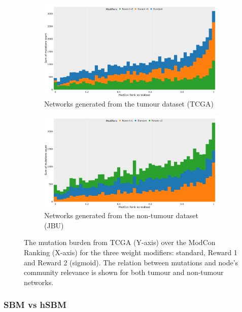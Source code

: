 \begin{figure}[!htb]
    \centering
    \begin{subfigure}{1.0\linewidth}
        \includegraphics[width=1.0\textwidth,keepaspectratio]{Sections/Network_II/validation/tum_modCon_hist.png}
        \caption{Networks generated from the tumour dataset (TCGA)}
    \end{subfigure} %
    \centering
    \begin{subfigure}{1.0\linewidth}
        \includegraphics[width=1.0\textwidth,keepaspectratio]{Sections/Network_II/validation/non_tum_modCon_hist.png}
        \caption{Networks generated from the non-tumour dataset (JBU)}
    \end{subfigure}
    \centering
    \caption{The mutation burden from TCGA (Y-axis) over the ModCon Ranking (X-axis) for the three weight modifiers: standard, Reward 1 and Reward 2 (sigmoid). The relation between mutations and node's community relevance is shown for both tumour and non-tumour networks.}
    \label{fig:N_II:modCon_modifiers}
\end{figure}

\subsubsection{SBM vs hSBM}

